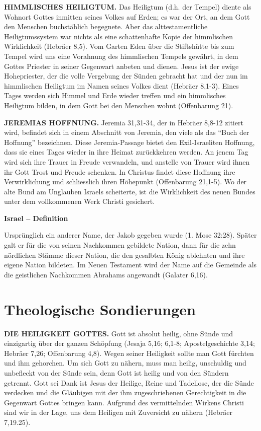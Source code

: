 \documentclass[
  12pt,
]{krantz}
\makeatletter
\newenvironment{kframe}{%
\medskip{}
\setlength{\fboxsep}{.8em}
 \def\at@end@of@kframe{}%
 \ifinner\ifhmode%
  \def\at@end@of@kframe{\end{minipage}}%
  \begin{minipage}{\columnwidth}%
 \fi\fi%
 \def\FrameCommand##1{\hskip\@totalleftmargin \hskip-\fboxsep
 \colorbox{shadecolor}{##1}\hskip-\fboxsep
     \hskip-\linewidth \hskip-\@totalleftmargin \hskip\columnwidth}%
 \MakeFramed {\advance\hsize-\width
   \@totalleftmargin\z@ \linewidth\hsize
   \@setminipage}}%
 {\par\unskip\endMakeFramed%
 \at@end@of@kframe}
\newenvironment{rmdblock}[1]
  {
  \begin{itemize}
  \renewcommand{\labelitemi}{
    \raisebox{-.7\height}[0pt][0pt]{
      {\setkeys{Gin}{width=3em,keepaspectratio}\texttt{[image: img/\#1]}}
    }
  }
  \setlength{\fboxsep}{1em}
  \begin{kframe}
  \item
  }
  {
  \end{kframe}
  \end{itemize}
  }
\newenvironment{rmddefinition}
  {\begin{rmdblock}{definition}}
  {\end{rmdblock}}
\makeatother
\begin{document}
\textbf{HIMMLISCHES HEILIGTUM.} Das Heiligtum (d.h. der Tempel) diente als Wohnort Gottes inmitten seines Volkes auf Erden; es war der Ort, an dem Gott den Menschen buchstäblich begegnete. Aber das alttestamentliche Heiligtumssystem war nichts als eine schattenhafte Kopie der himmlischen Wirklichkeit (Hebräer 8,5). Vom Garten Eden über die Stiftshütte bis zum Tempel wird uns eine Vorahnung des himmlischen Tempels gewährt, in dem Gottes Priester in seiner Gegenwart anbeten und dienen. Jesus ist der ewige Hohepriester, der die volle Vergebung der Sünden gebracht hat und der nun im himmlischen Heiligtum im Namen seines Volkes dient (Hebräer 8,1-3). Eines Tages werden sich Himmel und Erde wieder treffen und ein himmlisches Heiligtum bilden, in dem Gott bei den Menschen wohnt (Offenbarung 21).

\textbf{JEREMIAS HOFFNUNG.} Jeremia 31,31-34, der in Hebräer 8,8-12 zitiert wird, befindet sich in einem Abschnitt von Jeremia, den viele als das ``Buch der Hoffnung'' bezeichnen. Diese Jeremia-Passage bietet den Exil-Israeliten Hoffnung, dass sie eines Tages wieder in ihre Heimat zurückkehren werden. An jenem Tag wird sich ihre Trauer in Freude verwandeln, und anstelle von Trauer wird ihnen ihr Gott Trost und Freude schenken. In Christus findet diese Hoffnung ihre Verwirklichung und schliesslich ihren Höhepunkt (Offenbarung 21,1-5). Wo der alte Bund am Unglauben Israels scheiterte, ist die Wirklichkeit des neuen Bundes unter dem vollkommenen Werk Christi gesichert.

\begin{rmddefinition}
\textbf{Israel -- Definition}

Ursprünglich ein anderer Name, der Jakob gegeben wurde (1. Mose 32:28).
Später galt er für die von seinen Nachkommen gebildete Nation, dann für
die zehn nördlichen Stämme dieser Nation, die den gesalbten König
ablehnten und ihre eigene Nation bildeten. Im Neuen Testament wird der
Name auf die Gemeinde als die geistlichen Nachkommen Abrahams angewandt
(Galater 6,16).
\end{rmddefinition}

\hypertarget{theologische-sondierungen}{%
\section{Theologische Sondierungen}\label{theologische-sondierungen}}

\textbf{DIE HEILIGKEIT GOTTES.} Gott ist absolut heilig, ohne Sünde und einzigartig über der ganzen Schöpfung (Jesaja 5,16; 6,1-8; Apostelgeschichte 3,14; Hebräer 7,26; Offenbarung 4,8). Wegen seiner Heiligkeit sollte man Gott fürchten und ihm gehorchen. Um sich Gott zu nähern, muss man heilig, unschuldig und unbefleckt von der Sünde sein, denn Gott ist heilig und von den Sündern getrennt. Gott sei Dank ist Jesus der Heilige, Reine und Tadellose, der die Sünde verdecken und die Gläubigen mit der ihm zugeschriebenen Gerechtigkeit in die Gegenwart Gottes bringen kann. Aufgrund des vermittelnden Wirkens Christi sind wir in der Lage, uns dem Heiligen mit Zuversicht zu nähern (Hebräer 7,19.25).
\end{document}
